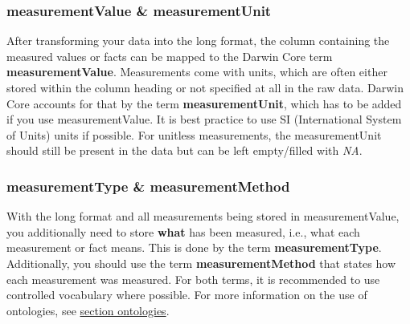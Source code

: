 \documentclass[
  oneside]{book}
\begin{document}
\subsubsection{measurementValue \& measurementUnit}\label{measurementvalue-measurementunit}

After transforming your data into the long format, the column containing the measured values or facts can be mapped to the Darwin Core term \textbf{measurementValue}. Measurements come with units, which are often either stored within the column heading or not specified at all in the raw data. Darwin Core accounts for that by the term \textbf{measurementUnit}, which has to be added if you use measurementValue. It is best practice to use SI (International System of Units) units if possible. For unitless measurements, the measurementUnit should still be present in the data but can be left empty/filled with \emph{NA}.

\subsubsection{measurementType \& measurementMethod}\label{measurementtype-measurementmethod}

With the long format and all measurements being stored in measurementValue, you additionally need to store \textbf{what} has been measured, i.e., what each measurement or fact means. This is done by the term \textbf{measurementType}. Additionally, you should use the term \textbf{measurementMethod} that states how each measurement was measured. For both terms, it is recommended to use controlled vocabulary where possible. For more information on the use of ontologies, see \hyperref[ontologies]{section ontologies}.
\end{document}
